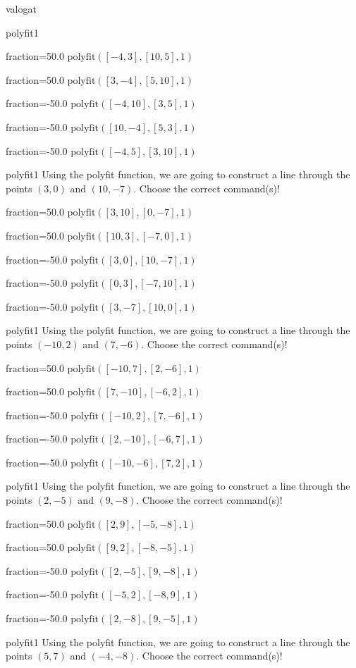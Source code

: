 \documentclass[12pt]{article}
\begin{document}
\begin{quiz}{valogat}
\begin{multi}[multiple]{polyfit1}
\item[fraction=50.0] $\mathrm{polyfit}([-4,3], [10,5], 1)$
\item[fraction=50.0] $\mathrm{polyfit}([3,-4], [5,10], 1)$
\item[fraction=-50.0]  $\mathrm{polyfit}([-4,10], [3,5], 1)$
\item[fraction=-50.0]  $\mathrm{polyfit}([10,-4], [5,3], 1)$
\item[fraction=-50.0]  $\mathrm{polyfit}([-4,5], [3,10], 1)$
\end{multi}
\begin{multi}[multiple]{polyfit1}
Using the polyfit function, we are going to construct a line through the points $\left(3,0\right)$ and $\left(10,-7\right)$.
Choose the correct command(s)!

\item[fraction=50.0] $\mathrm{polyfit}([3,10], [0,-7], 1)$
\item[fraction=50.0] $\mathrm{polyfit}([10,3], [-7,0], 1)$
\item[fraction=-50.0]  $\mathrm{polyfit}([3,0], [10,-7], 1)$
\item[fraction=-50.0]  $\mathrm{polyfit}([0,3], [-7,10], 1)$
\item[fraction=-50.0]  $\mathrm{polyfit}([3,-7], [10,0], 1)$
\end{multi}
\begin{multi}[multiple]{polyfit1}
Using the polyfit function, we are going to construct a line through the points $\left(-10,2\right)$ and $\left(7,-6\right)$.
Choose the correct command(s)!

\item[fraction=50.0] $\mathrm{polyfit}([-10,7], [2,-6], 1)$
\item[fraction=50.0] $\mathrm{polyfit}([7,-10], [-6,2], 1)$
\item[fraction=-50.0]  $\mathrm{polyfit}([-10,2], [7,-6], 1)$
\item[fraction=-50.0]  $\mathrm{polyfit}([2,-10], [-6,7], 1)$
\item[fraction=-50.0]  $\mathrm{polyfit}([-10,-6], [7,2], 1)$
\end{multi}
\begin{multi}[multiple]{polyfit1}
Using the polyfit function, we are going to construct a line through the points $\left(2,-5\right)$ and $\left(9,-8\right)$.
Choose the correct command(s)!

\item[fraction=50.0] $\mathrm{polyfit}([2,9], [-5,-8], 1)$
\item[fraction=50.0] $\mathrm{polyfit}([9,2], [-8,-5], 1)$
\item[fraction=-50.0]  $\mathrm{polyfit}([2,-5], [9,-8], 1)$
\item[fraction=-50.0]  $\mathrm{polyfit}([-5,2], [-8,9], 1)$
\item[fraction=-50.0]  $\mathrm{polyfit}([2,-8], [9,-5], 1)$
\end{multi}
\begin{multi}[multiple]{polyfit1}
Using the polyfit function, we are going to construct a line through the points $\left(5,7\right)$ and $\left(-4,-8\right)$.
Choose the correct command(s)!


\end{multi}
\end{quiz}
\end{document}
